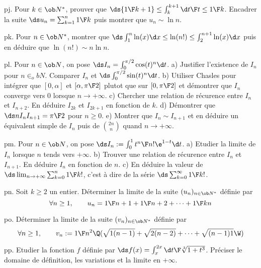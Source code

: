 \exo [Level=1,Fight=1,Learn=1,Field=\Intégration,Type=\Exercices,Origin=] pj. 
Pour $k\in\ob N^*$, prouver que $\ds{1\F k+1}\le \int_k^{k+1}{\d t\F t}\le {1\F k}$. 
Encadrer la suite $\ds u_n=\sum_{k=1}^n{1\F k}$ puis montrer que $u_n\sim \ln n$. 

\exo [Level=1,Fight=2,Learn=2,Field=\Intégration,Type=\Exercices,Origin=,Indication={Commencer par encadrer l'intégrale $\ds\int_k^{k+1}\ln(x)\d x$.} ]  pk. 
Pour $n\in\ob N^*$, montrer que $\ds \int_1^n\ln (x)\d x\le\ln(n!)\le \int_2^{n+1}\ln(x)\d x$ puis en déduire que $\ln(n!)\sim n\ln n$. \pn


\exo [Level=1,Fight=3,Learn=3,Field=\Intégration,Type=\Exercices,Origin=]  pl. 
Pour $n\in\ob N$, on pose $\ds I_n=\int_0^{\pi/2}\cos(t)^n\d t$. \pn
a) Justifier l'existence de $I_n$ pour $n\in_ob N$. Comparer $I_n$ et $\ds \int_0^{\pi/2}\sin(t)^n\d t$. \pn
b) Utiliser Chasles pour intégrer que $[0,\alpha]$ et $[\alpha,{\pi\F2}]$ plutot que sur $[0,{\pi\F 2}]$ et 
démontrer que $I_n$ converge vers $0$ lorsque $n\to+\infty$. \pn
c) Chercher une relation de récurence entre $I_n$ et $I_{n+2}$. En déduire $I_{2k}$ et $I_{2k+1}$ en fonction de $k$. \pn
d) Démontrer que $\ds nI_nI_{n+1}={\pi\F 2}$ pour $n\ge0$. \pn
e) Montrer que $I_n\sim I_{n+1}$ et en déduire un équivalent simple de $I_n$ puis de ${2n \choose n}$ quand $n\to+\infty$. 

\exo [Level=1,Fight=2,Learn=2,Field=\Intégration,Type=\Exercices,Origin=] pm. 
Pour $n\in\ob N$, on pose $\ds I_n:=\int_0^1{t^n\F n!}\e^{1-t}\d t$. \pn
a) Etudier la limite de $I_n$ lorsque $n$ tends vers $+\infty$. \pn
b) Trouver une relation de récurence entre $I_n$ et $I_{n+1}$. En déduire $I_n$ en fonction de $n$. \pn
c) En déduire la valeur de $\ds\lim_{n\to+\infty}\sum_{k=0}^n{1\F k!}$, c'est à dire de la série $\ds\sum_{k=0}^\infty{1\F k!}$. 

\exo [Level=1,Fight=1,Learn=1,Field=\Suites,Type=\Exercices,Origin=] pn. 
Soit $k\ge2$ un entier. Déterminer la limite de la suite $(u_n)_{n\in\ob N^*}$ définie par 
$$
\forall n\ge1, \qquad u_n={1\F n+1}+{1\F n+2}+\cdots+{1\F kn}
$$

\exo [Level=1,Fight=1,Learn=1,Field=\Suites,Type=\Exercices,Origin=] po. 
Déterminer la limite de la suite $(v_n)_{n\in\ob N^*}$ définie par 
$$
\forall n\ge1, \qquad v_n:={1\F n^2}\Q(\sqrt{1(n-1)}+\sqrt{2(n-2)}+\cdots+\sqrt{(n-1)1}\W)
$$

\exo [Level=1,Fight=2,Learn=2,Field=\FonctionsDéfiniesParUneIntégrale,Type=\Exercices,Origin=] pp. 
Etudier la fonction $f$ définie par $\ds f(x)=\int_x^{2x}{\d t\F\root 3\of{1+t^3}}$. \pn
Préciser le domaine de définition, les variations et la limite en $+\infty$. \pn

